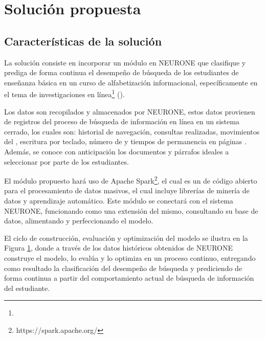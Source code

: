 \section{Solución propuesta}
\label{sec:solucion_propuesta}

\subsection{Características de la solución}
\label{subsec:caracteristicas-solucion}
La solución consiste en incorporar un módulo en NEURONE \parencite{gonzalez2017neurone} que clasifique y prediga de forma continua el desempeño de búsqueda de los estudiantes de enseñanza básica en un curso de alfabetización informacional, específicamente en el tema de investigaciones en línea\footnote{\traduccionlibre} (). 

Los datos son recopilados y almacenados por NEURONE, estos datos provienen de registros del proceso de búsqueda de información en línea en un sistema cerrado, los cuales son: historial de navegación, consultas realizadas, movimientos del , escritura por teclado, número de  y tiempos de permanencia en páginas . Además, se conoce con anticipación los documentos y párrafos ideales a seleccionar por parte de los estudiantes.

El módulo propuesto hará uso de Apache Spark\footnote{https://spark.apache.org/}, el cual es un  de código abierto para el procesamiento de datos masivos, el cual incluye librerías de minería de datos y aprendizaje automático. Este módulo se conectará con el sistema NEURONE, funcionando como una extensión del mismo, consultando su base de datos, alimentando y perfeccionando el modelo. 

El ciclo de construcción, evaluación y optimización del modelo se ilustra en la Figura \ref{fig:ml-pipeline}, donde a través de los datos históricos obtenidos de NEURONE construye el modelo, lo evalúa y lo optimiza en un proceso continuo, entregando como resultado la clasificación del desempeño de búsqueda y prediciendo de forma continua a partir del comportamiento actual de búsqueda de información del estudiante.

\begin{figure}[H]
	\centering
	\scalebox{0.8}{}
	\label{fig:ml-pipeline}
\end{figure}


